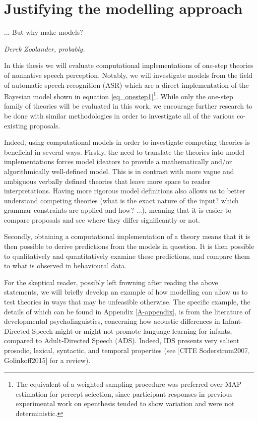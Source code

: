 \section{Justifying the modelling approach}
\setlength{\epigraphwidth}{0.4\textwidth}
\epigraph{... But why make models?}{\textit{Derek Zoolander, probably.}}

In this thesis we will evaluate computational implementations of one-step theories of nonnative speech perception. Notably, we will investigate models from the field of automatic speech recognition (ASR) which are a direct implementation of the Bayesian model shown in equation \ref{eq_onestep1}\footnote{The equivalent of a weighted sampling procedure was preferred over MAP estimation for percept selection, since participant responses in previous experimental work on epenthesis tended to show variation and were not deterministic.}. 
While only the one-step family of theories will be evaluated in this work, we encourage further research to be done with similar methodologies in order to investigate all of the various co-existing proposals.

Indeed, using computational models in order to investigate competing theories is beneficial in several ways. Firstly, the need to translate the theories into model implementations forces model ideators to provide a mathematically and/or algorithmically well-defined model. This is in contrast with more vague and ambiguous verbally defined theories that leave more space to reader interpretations. Having more rigorous model definitions also allows us to better understand competing theories (what is the exact nature of the input? which grammar constraints are applied and how? ...), meaning that it is easier to compare proposals and see where they differ significantly or not. 

Secondly, obtaining a computational implementation of a theory means that it is then possible to derive predictions from the models in question. It is then possible to qualitatively and quantitatively examine these predictions, and compare them to what is observed in behavioural data.

For the skeptical reader, possibly left frowning after reading the above statements, we will briefly develop an example of how modelling can allow us to test theories in ways that may be unfeasible otherwise. The specific example, the details of which can be found in Appendix \ref{A-appendix}, is from the literature of developmental psycholinguistics, concerning how acoustic differences in Infant-Directed Speech might or might not promote language learning for infants, compared to Adult-Directed Speech (ADS). Indeed, IDS presents very salient prosodic, lexical, syntactic, and temporal properties (see [CITE Soderstrom2007, Golinkoff2015] for a review).

